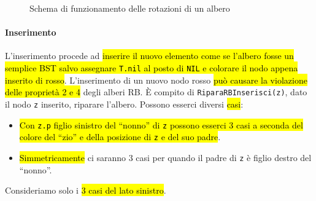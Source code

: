 \documentclass[a4paper,11pt,twoside]{article}
\theoremstyle{plain}
\theoremstyle{definition}
\theoremstyle{remark}
\begin{document}
\begin{figure}[htb]
  \centering
  \caption{Schema di funzionamento delle rotazioni di un albero}%
  \label{fig:bst-rotate}
\end{figure}

\paragraph{Inserimento} L'inserimento procede ad \hl{inserire il nuovo elemento
come se l'albero fosse un semplice BST salvo assegnare \texttt{T.nil} al posto
di \texttt{NIL} e colorare il nodo appena inserito di rosso}. L'inserimento di
un nuovo nodo rosso \hl{può causare la violazione delle proprietà 2 e 4} degli
alberi RB. È compito di \texttt{RiparaRBInserisci(z)}, dato il nodo \texttt{z}
inserito, riparare l'albero. Possono esserci diversi \hl{casi}:

\begin{itemize}
  \item \hl{Con \texttt{z.p} figlio sinistro del ``nonno'' di \texttt{z} possono
    esserci 3 casi a seconda del colore del ``zio'' e della posizione di
    \texttt{z} e del suo padre}.
  \item \hl{Simmetricamente} ci saranno 3 casi per quando il padre di \texttt{z}
    è figlio destro del ``nonno''.
\end{itemize}

\noindent Consideriamo solo i \hl{3 casi del lato sinistro}.
\end{document}
